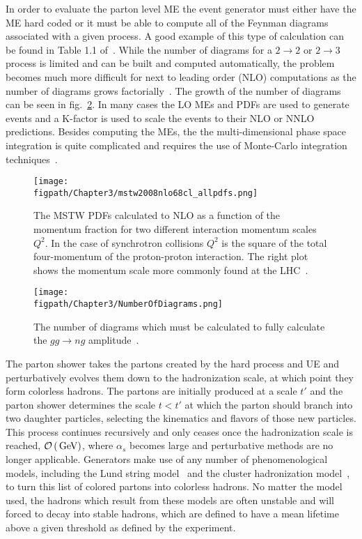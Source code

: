 In order to evaluate the parton level ME the event generator must either have the ME hard coded or it must be able to compute all of the Feynman diagrams associated with a given process.
A good example of this type of calculation can be found in Table 1.1 of~\cite{Siegert:2010cru}.
While the number of diagrams for a $2\rightarrow2$ or $2\rightarrow3$ process is limited and can be built and computed automatically, the problem becomes much more difficult for next to leading order (NLO) computations as the number of diagrams grows factorially~\cite{Kurihara:2002ne}.
The growth of the number of diagrams can be seen in fig.~\ref{fig:NumberOfDiagrams}.
In many cases the LO MEs and PDFs are used to generate events and a K-factor is used to scale the events to their NLO or NNLO predictions.
Besides computing the MEs, the the multi-dimensional phase space integration is quite complicated and requires the use of Monte-Carlo integration techniques~\cite{MonteCarloMethods}.

\begin{figure}[!hbt]
    \vspace*{-0.5cm}
    \centering
    \texttt{[image: \\figpath/Chapter3/mstw2008nlo68cl\_allpdfs.png]}
    \caption{The MSTW PDFs calculated to NLO as a function of the momentum fraction for two different interaction momentum scales $Q^{2}$. In the case of synchrotron collisions $Q^{2}$ is the square of the total four-momentum of the proton-proton interaction. The right plot shows the momentum scale more commonly found at the LHC~\cite{Martin:2009iq}.}
    \label{fig:mstw}
\end{figure}

\begin{figure}[!hbt]
    \vspace*{-0.5cm}
    \centering
    \texttt{[image: \\figpath/Chapter3/NumberOfDiagrams.png]}
    \caption{The number of diagrams which must be calculated to fully calculate the $gg\rightarrow{ng}$ amplitude~\cite{Siegert:2010cru}.}
    \label{fig:NumberOfDiagrams}
\end{figure}

The parton shower takes the partons created by the hard process and UE and perturbatively evolves them down to the hadronization scale, at which point they form colorless hadrons.
The partons are initially produced at a scale $t'$ and the parton shower determines the scale $t<t'$ at which the parton should branch into two daughter particles, selecting the kinematics and flavors of those new particles.
This process continues recursively and only ceases once the hadronization scale is reached, $\mathcal{O}\left(\,\text{Ge\hspace{-.08em}V}\right)$, where $\alpha_{s}$ becomes large and perturbative methods are no longer applicable. 
Generators make use of any number of phenomenological models, including the Lund string model~\cite{ANDERSSON198331,Andersson:1997hs} and the cluster hadronization model~\cite{WEBBER1984492,Winter:2003tt}, to turn this list of colored partons into colorless hadrons.
No matter the model used, the hadrons which result from these models are often unstable and will forced to decay into stable hadrons, which are defined to have a mean lifetime above a given threshold as defined by the experiment.

